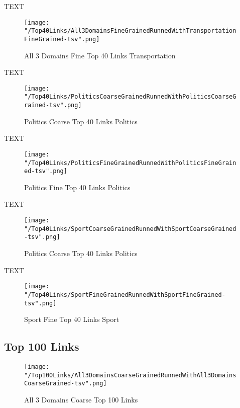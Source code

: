 \documentclass[thesis=M,english]{FITthesis}[2018/05/30]
\begin{document}
		TEXT	

	\begin{figure}\centering
		\texttt{[image: "/Top40Links/All3DomainsFineGrainedRunnedWithTransportationFineGrained-tsv".png]}
		\caption{All 3 Domains Fine Top 40 Links Transportation}\label{}	
	\end{figure}
	
	TEXT

	\begin{figure}\centering
		\texttt{[image: "/Top40Links/PoliticsCoarseGrainedRunnedWithPoliticsCoarseGrained-tsv".png]}
		\caption{Politics Coarse Top 40 Links Politics}\label{}
	\end{figure}	

	TEXT	

	\begin{figure}\centering
		\texttt{[image: "/Top40Links/PoliticsFineGrainedRunnedWithPoliticsFineGrained-tsv".png]}
		\caption{Politics Fine Top 40 Links Politics}\label{}
	\end{figure}

	
	TEXT

	\begin{figure}\centering
		\texttt{[image: "/Top40Links/SportCoarseGrainedRunnedWithSportCoarseGrained-tsv".png]}
		\caption{Politics Coarse Top 40 Links Politics}\label{}
	\end{figure}		
	
		TEXT	

	\begin{figure}\centering
		\texttt{[image: "/Top40Links/SportFineGrainedRunnedWithSportFineGrained-tsv".png]}
		\caption{Sport Fine Top 40 Links Sport}\label{}	
	\end{figure}	

\subsection{Top 100 Links}

	\begin{figure}\centering
		\texttt{[image: "/Top100Links/All3DomainsCoarseGrainedRunnedWithAll3DomainsCoarseGrained-tsv".png]}
		\caption{All 3 Domains Coarse Top 100 Links}\label{}
	\end{figure}
\end{document}
